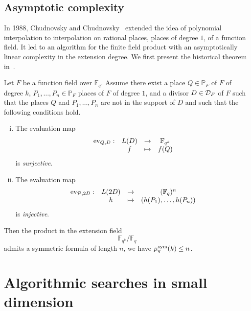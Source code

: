 \subsection{Asymptotic complexity}

In 1988, Chudnovsky and Chudnovsky~\cite{CC88} extended the idea of polynomial
interpolation to interpolation on rational places, \ie places of degree $1$, of
a function field. It led to an algorithm for the finite field product with an
asymptotically linear complexity in the extension degree. We first present the historical theorem
in~\cite{CC88}.
\begin{thm}
  \label{thm:CC88}
  Let $F$ be a function field over $\mathbb{F}_q$.
  Assume there exist a place $Q\in\mathbb{P}_{F}$ of $F$ of degree $k$, $P_1,
  \dots, P_n\in\mathbb{P}_F$ places of $F$ of degree $1$, and a divisor
  $D\in\mathcal{D}_F$ of $F$ such that the places $Q$ and $P_1, \dots, P_n$ are not in
  the support of $D$ and such that the following conditions hold.
  \begin{enumerate}[(i)]
    \item \label{cond:1} The evaluation map
      \[
        \begin{array}{cccc}
        \operatorname{ev}_{Q, D}: & L(D) & \to & \mathbb{F}_{q^k}\\
  & f & \mapsto & f(Q)
\end{array}
\]
is \emph{surjective}.
    \item \label{cond:2} The evaluation map
      \[
        \begin{array}{cccc}
        \operatorname{ev}_{\mathcal{P}, 2D}: & L(2D) & \to & (\mathbb{F}_{q})^n\\
  & h & \mapsto & (h(P_1), \dots, h(P_n))
\end{array}
\]
is \emph{injective}.
  \end{enumerate}
  Then the product in the extension field 
  \[
    \mathbb{F}_{q^k}/\mathbb{F}_q
  \]
  admits a symmetric formula of length $n$, \ie we have $\mu^{\textrm{sym}}_q(k)\leq n$.
\end{thm}

\section{Algorithmic searches in small dimension}

%
